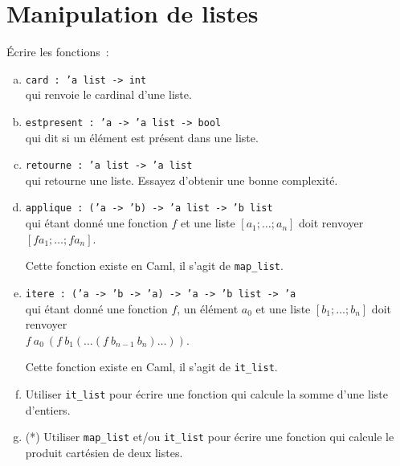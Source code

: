 \documentclass[10pt,a4paper]{article}
\begin{document}
\section{Manipulation de listes}
Écrire les fonctions~:
\begin{enumerate}[a)]
\item \texttt{card : ’a list -> int}\\ qui renvoie le cardinal d'une liste.

\item \texttt{estpresent : ’a -> ’a list -> bool}\\ qui dit si un élément est présent dans une liste.

\item \texttt{retourne : ’a list -> ’a list}\\ qui retourne une liste. Essayez d'obtenir une bonne complexité.

\item \texttt{applique : (’a -> ’b) -> ’a list -> ’b list}\\
qui étant donné une fonction $f$ et une liste $[a_1;\dots ;a_n]$ doit renvoyer $[f a_1;\dots ;f a_n]$.

Cette fonction existe en Caml, il s'agit de \texttt{map\_list}.

\item \texttt{itere : (’a -> ’b -> ’a) -> ’a -> ’b list -> ’a}\\
qui étant donné une fonction $f$, un élément $a_0$ et une liste $[b_1;\dots ;b_n]$ doit renvoyer \\$f\ a_0\ (f\ b_1 ( \dots (f\ b_{n-1}\ b_n)\dots ))$.

Cette fonction existe en Caml, il s'agit de \texttt{it\_list}.

\item Utiliser \texttt{it\_list} pour écrire une fonction qui calcule la somme d'une liste d'entiers.

\item(*) Utiliser \texttt{map\_list} et/ou \texttt{it\_list} pour écrire une fonction qui calcule le produit cartésien de deux listes.
\end{enumerate}
\end{document}
